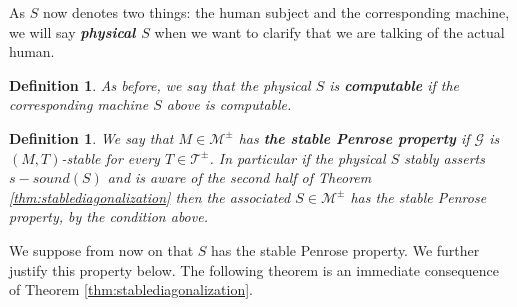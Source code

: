 \documentclass{amsart}  %
\numberwithin{equation}{section}
\newtheorem{remark}[equation]{Remark}
\newtheorem{definition}[equation]{Definition}
\theoremstyle{definition}
\theoremstyle{remark}
\begin{document}
{As $S$ now denotes two things: the human subject and the corresponding machine, we will say \textbf{\emph{physical $S$}} when we want to clarify that we are talking of the actual  human.
\begin{definition} As before, we say that the physical $S$  is \textbf{\emph{computable}} if the corresponding machine ${S}$ above is computable.
\end{definition}
\begin{definition} We say that $M \in \mathcal{M} ^{\pm} $ has \textbf{\emph{the stable Penrose property}} if $\mathcal{G}$ is $(M,T)$-stable for every $T \in \mathcal{T} ^{\pm} $.
In particular if the physical $S $ stably asserts $s-sound ({S})$ and is aware of the second half of Theorem \ref{thm:stablediagonalization} then the associated  $S \in \mathcal{M} ^{\pm} $ has the stable Penrose property, by the condition above.
\end{definition} 
We suppose from now on that $S$ has the stable Penrose property.
We further justify this property below.
The following theorem is an immediate consequence of Theorem \ref{thm:stablediagonalization}. 

}
\end{document}
